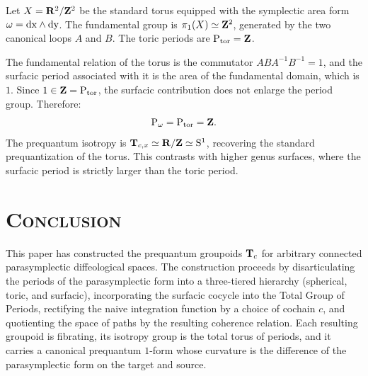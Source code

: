 \documentclass[11pt,reqno,letterpaper,twoside]{amsart}
\begin{document}
  \begin{article}
    \label{art:The Torus T2}
    
    Let $X = {\mathbf{R}}^2/{\mathbf{Z}}^2$ be the standard torus equipped with the symplectic area form $\omega = \mathrm{dx} \wedge \mathrm{dy}$.
    The fundamental group is $\pi_1(X) \simeq {\mathbf{Z}}^2$,
    generated by the two canonical loops $A$ and $B$.
    The toric periods are $\operatorname{P}_{\mathrm{tor}} = {\mathbf{Z}}$.
    
    The fundamental relation of the torus is the commutator $ABA^{-1}B^{-1} = 1$,
    and the surfacic period associated with it is the area of the fundamental domain,
    which is $1$.
    Since $1 \in {\mathbf{Z}} = \operatorname{P}_{\mathrm{tor}}$,
    the surfacic contribution does not enlarge the period group.
    Therefore:
    \[
      \operatorname{P}_\omega = \operatorname{P}_{\mathrm{tor}} = {\mathbf{Z}}.
      \]
    The prequantum isotropy is $\mathbf{T}_{c, x} \simeq {\mathbf{R}}/{\mathbf{Z}} \simeq \mathrm{S}^1$,
    recovering the standard prequantization of the torus.
    This contrasts with higher genus surfaces,
    where the surfacic period is strictly larger than the toric period.
  \end{article}
  
  
  \section*{\textsc{\textbf{Conclusion}}}
  \label{sec:Conclusion}
  
  This paper has constructed the prequantum groupoids $\mathbf{T}_c$ for arbitrary connected parasymplectic diffeological spaces.
  The construction proceeds by disarticulating the periods of the parasymplectic form into a three-tiered hierarchy
  (spherical, toric, and surfacic),
  incorporating the surfacic cocycle into the Total Group of Periods,
  rectifying the naive integration function by a choice of cochain $c$,
  and quotienting the space of paths by the resulting coherence relation.
  Each resulting groupoid is fibrating,
  its isotropy group is the total torus of periods,
  and it carries a canonical prequantum $1$-form whose curvature is the difference of the parasymplectic form on the target and source.
  
\end{document}
